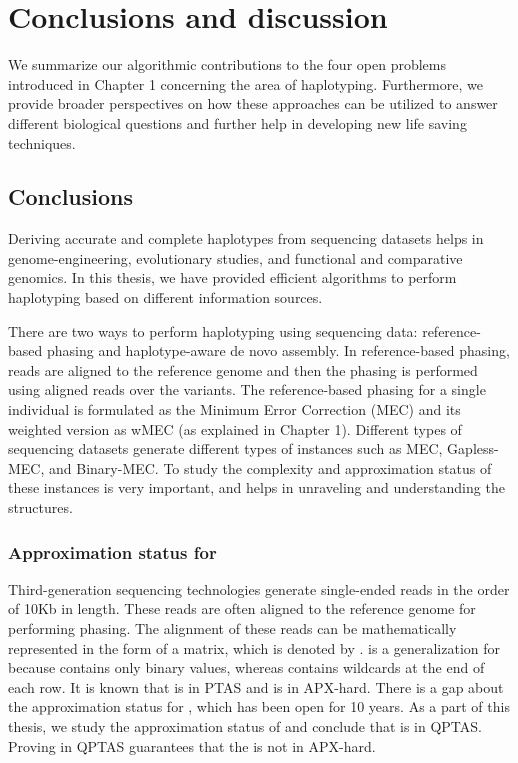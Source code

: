 \chapter{Conclusions and discussion}
We summarize our algorithmic contributions to the four open problems introduced in Chapter 1 concerning the area of haplotyping.
Furthermore, we provide broader perspectives on how these approaches can be utilized to answer different biological questions and further help in developing new life saving techniques.

\section{Conclusions}
Deriving accurate and complete haplotypes from sequencing datasets helps in genome-engineering, evolutionary studies, and functional and comparative genomics.
In this thesis, we have provided efficient algorithms to perform haplotyping based on different information sources.

There are two ways to perform haplotyping using sequencing data: reference-based phasing and haplotype-aware de novo assembly.
In reference-based phasing, reads are aligned to the reference genome and then the phasing is performed using aligned reads over the variants.
The reference-based phasing for a single individual is formulated as the Minimum Error Correction (MEC) and its weighted version as wMEC (as explained in Chapter 1).
Different types of sequencing datasets generate different types of instances such as MEC, Gapless-MEC, and Binary-MEC.
To study the complexity and approximation status of these instances is very important, and helps in unraveling and understanding the structures.

\subsection{Approximation status for \GMEC}
Third-generation sequencing technologies generate single-ended reads in the order of 10Kb in length. These reads are often aligned to the reference genome for performing phasing.
The alignment of these reads can be mathematically represented in the form of a matrix, which is denoted by \GMEC.
\GMEC is a generalization for \BMEC because \BMEC contains only binary values, whereas \GMEC contains wildcards at the end of each row. 
It is known that \BMEC is in PTAS and \MEC is in APX-hard.
There is a gap about the approximation status for \GMEC, which has been open for 10 years.  
As a part of this thesis, we study the approximation status of \GMEC and conclude that \GMEC is in QPTAS.
Proving \GMEC in QPTAS guarantees that the \GMEC is not in APX-hard.


